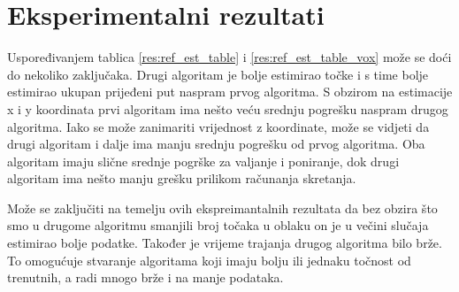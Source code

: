 \chapter{Eksperimentalni rezultati}
Uspoređivanjem tablica \ref{res:ref_est_table} i \ref{res:ref_est_table_vox} može se doći do nekoliko zaključaka. Drugi algoritam je bolje estimirao točke i s time bolje estimirao ukupan prijeđeni put naspram prvog algoritma. S obzirom na estimacije x i y koordinata prvi algoritam ima nešto veću srednju pogrešku naspram drugog algoritma. Iako se može zanimariti vrijednost z koordinate, može se vidjeti da drugi algoritam i dalje ima manju srednju pogrešku od prvog algoritma. Oba algoritam imaju slične srednje pogrške za valjanje i poniranje, dok drugi algoritam ima nešto manju grešku prilikom računanja skretanja.

Može se zaključiti na temelju ovih ekspreimantalnih rezultata da bez obzira što smo u drugome algoritmu smanjili broj točaka u oblaku on je u večini slučaja estimirao bolje podatke. Također je vrijeme trajanja drugog algoritma bilo brže. To omogućuje stvaranje algoritama koji imaju bolju ili jednaku točnost od trenutnih, a radi mnogo brže i na manje podataka.
